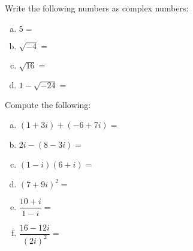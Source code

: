 \documentclass[11pt,letterpaper]{article}
\begin{document}
\newpage



 Write the following numbers as complex numbers:
\begin{enumerate}[(a)]
\item $5=$ \vfill
\item $\sqrt{-4}=$ \vfill
\item $\sqrt{16}=$ \vfill
\item $1 - \sqrt{-24}=$ \vfill
\end{enumerate}



 Compute the following:
\begin{enumerate}[(a)]
\item $(1 + 3i) + (-6 + 7i)=$ \vfill
\item $2i - (8 - 3i)=$ \vfill
\item $(1 - i)(6 + i)=$ \vfill
\item $(7 + 9i)^2=$ \vfill
\item $\dfrac{10 + i}{1 - i}=$ \vfill
\item $\dfrac{16 - 12i}{(2i)^2}=$ \vfill
\end{enumerate}


\end{document}
